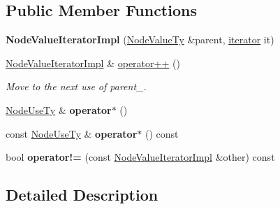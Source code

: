 \subsection*{Public Member Functions}
\begin{DoxyCompactItemize}
\item 
\mbox{\label{classglow_1_1_node_value_iterator_impl_a402b53904b525b1678617d4b38a539d0}} 
{\bfseries Node\+Value\+Iterator\+Impl} (\hyperlink{classglow_1_1_node_value_iterator_impl_ae219906549ad90e5c4bd3f5424767070}{Node\+Value\+Ty} \&parent, \hyperlink{classglow_1_1_node_value_iterator_impl_a7bd4a74736e858846d2884bbb06b2862}{iterator} it)
\item 
\mbox{\label{classglow_1_1_node_value_iterator_impl_a3535cc3d81f36b1ae663d8315be120d8}} 
\hyperlink{classglow_1_1_node_value_iterator_impl}{Node\+Value\+Iterator\+Impl} \& \hyperlink{classglow_1_1_node_value_iterator_impl_a3535cc3d81f36b1ae663d8315be120d8}{operator++} ()
\begin{DoxyCompactList}\small\item\em Move to the next use of parent\+\_\+. \end{DoxyCompactList}\item 
\mbox{\label{classglow_1_1_node_value_iterator_impl_a09ca8bf60f823ecdf32d807421cb7c5b}} 
\hyperlink{classglow_1_1_node_value_iterator_impl_a188009c2b4658372cf779a20bb9ace75}{Node\+Use\+Ty} \& {\bfseries operator$\ast$} ()
\item 
\mbox{\label{classglow_1_1_node_value_iterator_impl_ab849cf3bb99d514a2c5c9ba8ffcc522e}} 
const \hyperlink{classglow_1_1_node_value_iterator_impl_a188009c2b4658372cf779a20bb9ace75}{Node\+Use\+Ty} \& {\bfseries operator$\ast$} () const
\item 
\mbox{\label{classglow_1_1_node_value_iterator_impl_a8c251ce38821b9bbca2a7f21a704b09a}} 
bool {\bfseries operator!=} (const \hyperlink{classglow_1_1_node_value_iterator_impl}{Node\+Value\+Iterator\+Impl} \&other) const
\end{DoxyCompactItemize}


\subsection{Detailed Description}
